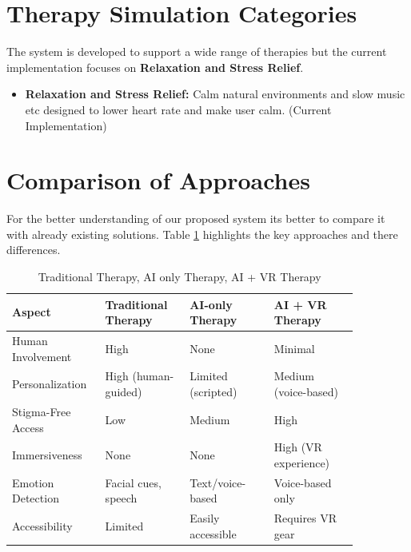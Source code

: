 \section{Therapy Simulation Categories}

The system is developed to support a wide range of therapies but the current implementation focuses on \textbf{Relaxation and Stress Relief}.

\begin{itemize}
    \item \textbf{Relaxation and Stress Relief:} Calm natural environments and slow music etc designed to lower heart rate and make user calm. (Current Implementation)
\end{itemize}

\section{Comparison of Approaches}

For the better understanding of our proposed system its better to compare it with already existing solutions. Table \ref{tab:comparison} highlights the key approaches and there differences.

\begin{table}[H]
\centering
\small
\renewcommand{\arraystretch}{1.3}
\caption{Traditional Therapy, AI only Therapy, AI + VR Therapy}
\label{tab:comparison}
\begin{tabular}{@{} p{0.2\linewidth} p{0.22\linewidth} p{0.22\linewidth} p{0.22\linewidth} @{}}
\toprule
\rowcolor{gray!20} \textbf{Aspect} & \textbf{Traditional Therapy} & \textbf{AI-only Therapy} & \textbf{AI + VR Therapy} \\
\midrule
Human Involvement & High & None & Minimal \\
Personalization & High (human-guided) & Limited (scripted) & Medium (voice-based) \\
Stigma-Free Access & Low & Medium & High \\
Immersiveness & None & None & High (VR experience) \\
Emotion Detection & Facial cues, speech & Text/voice-based & Voice-based only \\
Accessibility & Limited & Easily accessible & Requires VR gear \\
\bottomrule
\end{tabular}
\end{table}

